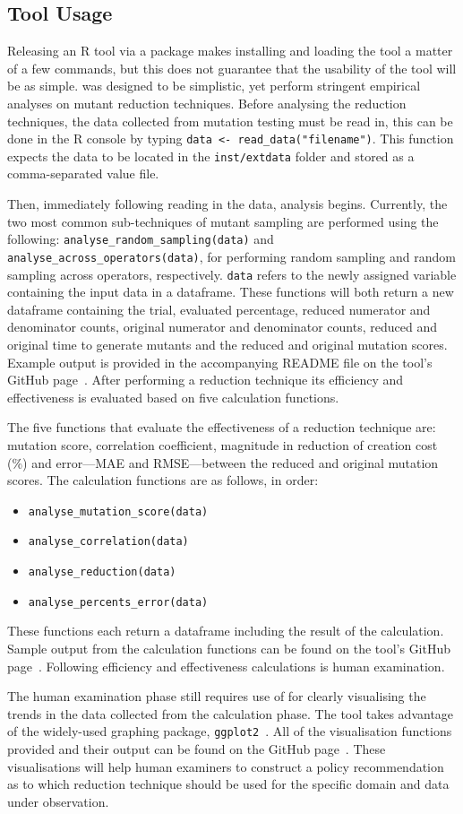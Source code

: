 \subsection{Tool Usage}

Releasing an R tool via a package makes installing and loading the tool
a matter of a few commands, but this does not guarantee that the usability
of the tool will be as simple. \mr was designed to be simplistic,
yet perform stringent empirical analyses on mutant reduction techniques. Before
analysing the reduction techniques, the data collected from mutation testing
must be read in, this can be done in the R console by typing {\small\texttt{data <- read\_data("filename")}}.
This function expects the data to be located in the \texttt{inst/extdata} folder
and stored as a comma-separated value file.

Then, immediately following reading in the data, analysis begins. Currently, the two most common
sub-techniques of mutant sampling are performed using the following:
\texttt{analyse\_random\_sampling(data)} and \texttt{analyse\_across\_operators(data)},
for performing random sampling and random sampling across operators, respectively. \texttt{data} refers to the
newly assigned variable containing the input data in a dataframe.
These functions will both return a new dataframe containing the trial, evaluated percentage, reduced
numerator and denominator counts, original numerator and denominator counts, reduced and original time
to generate mutants and the reduced and original mutation scores. Example output is provided in the accompanying
README file on the tool's GitHub page~\cite{tool}. After performing a reduction technique its efficiency and
effectiveness is evaluated based on five calculation functions.

The five functions that evaluate the effectiveness of a reduction technique are: mutation score, correlation coefficient, magnitude
in reduction of creation cost (\%) and error---MAE and RMSE---between the reduced and original mutation scores.
The calculation functions are as follows, in order:
\begin{itemize}
\item \texttt{analyse\_mutation\_score(data)}
\item \texttt{analyse\_correlation(data)}
\item \texttt{analyse\_reduction(data)}
\item \texttt{analyse\_percents\_error(data)}
\end{itemize}
These functions each return a dataframe including the result of the calculation.
Sample output from the calculation functions can be found on
the tool's GitHub page~\cite{tool}. Following efficiency and effectiveness calculations is human examination.

The human examination phase still requires use of \mr for clearly visualising the trends in the data
collected from the calculation phase. The \mr tool takes advantage of the widely-used graphing package, \texttt{ggplot2}~\cite{ggplot2}.
All of the visualisation functions provided and their output can be found on the GitHub page~\cite{tool}.
These visualisations will help human examiners to construct a policy recommendation as to which reduction technique
should be used for the specific domain and data under observation.
